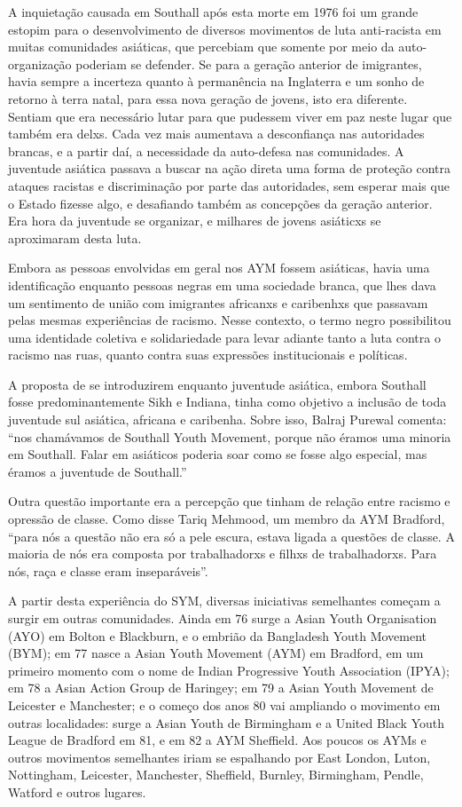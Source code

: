 A inquietação causada em Southall após esta morte em 1976 foi um grande estopim para o desenvolvimento de diversos movimentos de luta anti-racista em muitas comunidades asiáticas, que percebiam que somente por meio da auto-organização poderiam se defender. Se para a geração anterior de imigrantes, havia sempre a incerteza quanto à permanência na Inglaterra e um sonho de retorno à terra natal, para essa nova geração de jovens, isto era diferente. Sentiam que era necessário lutar para que pudessem viver em paz neste lugar que também era delxs. Cada vez mais aumentava a desconfiança nas autoridades brancas, e a partir daí, a necessidade da auto-defesa nas comunidades. A juventude asiática passava a buscar na ação direta uma forma de proteção contra ataques racistas e discriminação por parte das autoridades, sem esperar mais que o Estado fizesse algo, e desafiando também as concepções da geração anterior. Era hora da juventude se organizar, e milhares de jovens asiáticxs se aproximaram desta luta.

Embora as pessoas envolvidas em geral nos AYM fossem asiáticas, havia uma identificação enquanto pessoas negras em uma sociedade branca, que lhes dava um sentimento de união com imigrantes africanxs e caribenhxs que passavam pelas mesmas experiências de racismo. Nesse contexto, o termo negro possibilitou uma identidade coletiva e solidariedade para levar adiante tanto a luta contra o racismo nas ruas, quanto contra suas expressões institucionais e políticas.


A proposta de se introduzirem enquanto juventude asiática, embora Southall fosse predominantemente Sikh e Indiana, tinha como objetivo a inclusão de toda juventude sul asiática, africana e caribenha. Sobre isso, Balraj Purewal comenta: “nos chamávamos de Southall Youth Movement, porque não éramos uma minoria em Southall. Falar em asiáticos poderia soar como se fosse algo especial, mas éramos a juventude de Southall.”

Outra questão importante era a percepção que tinham de relação entre racismo e opressão de classe. Como disse Tariq Mehmood, um membro da AYM Bradford, “para nós a questão não era só a pele escura, estava ligada a questões de classe. A maioria de nós era composta por trabalhadorxs e filhxs de trabalhadorxs. Para nós, raça e classe eram inseparáveis”.

A partir desta experiência do SYM, diversas iniciativas semelhantes começam a surgir em outras comunidades. Ainda em 76 surge a Asian Youth Organisation (AYO) em Bolton e Blackburn, e o embrião da Bangladesh Youth Movement (BYM); em 77 nasce a Asian Youth Movement (AYM) em Bradford, em um primeiro momento com o nome de Indian Progressive Youth Association (IPYA); em 78 a Asian Action Group de Haringey; em 79 a Asian Youth Movement de Leicester e Manchester; e o começo dos anos 80 vai ampliando o movimento em outras localidades: surge a Asian Youth de Birmingham e a United Black Youth League de Bradford em 81, e em 82 a AYM Sheffield. Aos poucos os AYMs e outros movimentos semelhantes iriam se espalhando por East London, Luton, Nottingham, Leicester, Manchester, Sheffield, Burnley, Birmingham, Pendle, Watford e outros lugares.

